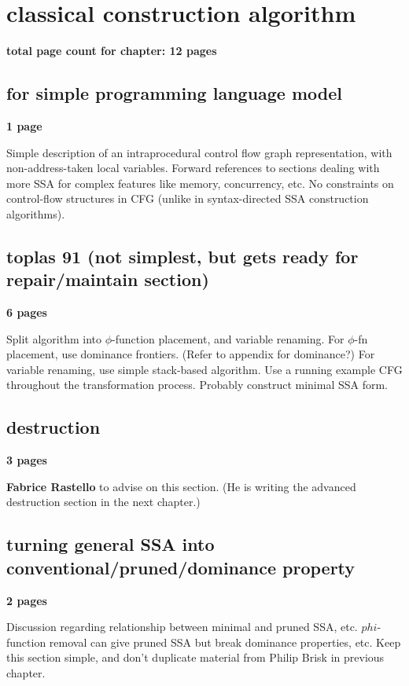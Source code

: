 \chapter*{classical construction algorithm}



\textbf{total page count for chapter: 12 pages}

\section{for simple programming language model}
\textbf{1 page}

Simple description of an intraprocedural control flow graph
representation, with non-address-taken local variables.
Forward references to sections dealing with more SSA for complex
features like memory, concurrency, etc.
No constraints on control-flow structures in CFG
(unlike in syntax-directed SSA construction algorithms).


\section{toplas 91 (not simplest, but gets ready for repair/maintain section)}
\textbf{6 pages}

Split algorithm into $\phi$-function placement, and variable
renaming. For $\phi$-fn placement, use dominance frontiers.
(Refer to appendix for dominance?) 
For variable renaming, use simple stack-based algorithm.
Use a running example CFG throughout the transformation process.
Probably construct minimal SSA form.

\section{destruction}
\textbf{3 pages}

\textbf{Fabrice Rastello} to advise on this section. (He is writing
the advanced destruction section in the next chapter.)

\section{turning general SSA into conventional/pruned/dominance property}
\textbf{2 pages}

Discussion regarding relationship between minimal and pruned SSA, etc.
$phi$-function removal can give pruned SSA but break
dominance properties, etc. Keep this section simple, and don't duplicate
material from Philip Brisk in previous chapter.


